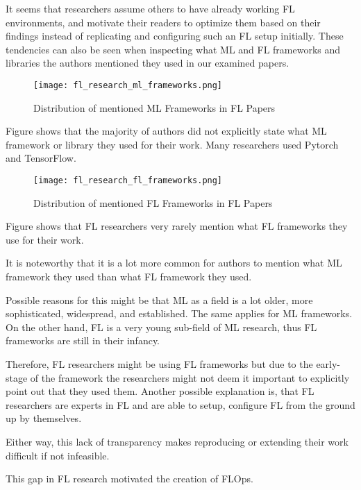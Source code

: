 It seems that researchers assume others to have already working FL environments,
and motivate their readers to optimize them based on their findings
instead of replicating and configuring such an FL setup initially.
These tendencies can also be seen when inspecting what ML and FL frameworks and libraries
the authors mentioned they used in our examined papers.

\begin{figure}[h]
    \centering
    \texttt{[image: fl\_research\_ml\_frameworks.png]}
    \caption{Distribution of mentioned ML Frameworks in FL Papers}
    \label{fig:fl_research_ml_frameworks}
\end{figure}

Figure \cite{fig:fl_research_ml_frameworks} shows that the majority of authors
did not explicitly state what ML framework or library they used for their work.
Many researchers used Pytorch and TensorFlow.

\begin{figure}[h]
    \centering
    \texttt{[image: fl\_research\_fl\_frameworks.png]}
    \caption{Distribution of mentioned FL Frameworks in FL Papers}
    \label{fig:fl_research_fl_frameworks}
\end{figure}

Figure \cite{fig:fl_research_fl_frameworks} shows that FL researchers
very rarely mention what FL frameworks they use for their work.

It is noteworthy that it is a lot more common for authors to mention what ML 
framework they used than what FL framework they used.

Possible reasons for this might be that ML as a field is a lot older, more sophisticated,
widespread, and established.
The same applies for ML frameworks.
On the other hand, FL is a very young sub-field of ML research,
thus FL frameworks are still in their infancy.

Therefore, FL researchers might be using FL frameworks but due to the early-stage 
of the framework the researchers might not deem it important to explicitly point out that they used them.
Another possible explanation is, that FL researchers are experts in FL and
are able to setup, configure FL from the ground up by themselves.

Either way, this lack of transparency makes reproducing or extending
their work difficult if not infeasible.

This gap in FL research motivated the creation of FLOps.